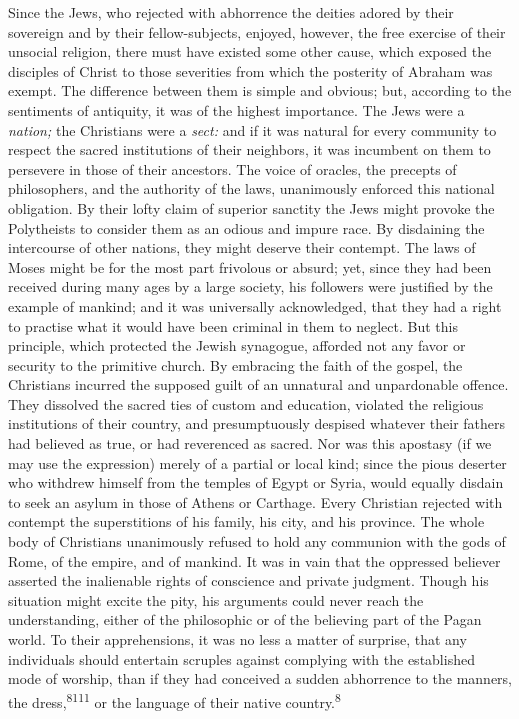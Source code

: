 Since the Jews, who rejected with abhorrence the deities adored
by their sovereign and by their fellow-subjects, enjoyed,
however, the free exercise of their unsocial religion, there must
have existed some other cause, which exposed the disciples of
Christ to those severities from which the posterity of Abraham
was exempt. The difference between them is simple and obvious;
but, according to the sentiments of antiquity, it was of the
highest importance. The Jews were a \textit{nation;} the Christians were
a \textit{sect:} and if it was natural for every community to respect
the sacred institutions of their neighbors, it was incumbent on
them to persevere in those of their ancestors. The voice of
oracles, the precepts of philosophers, and the authority of the
laws, unanimously enforced this national obligation. By their
lofty claim of superior sanctity the Jews might provoke the
Polytheists to consider them as an odious and impure race. By
disdaining the intercourse of other nations, they might deserve
their contempt. The laws of Moses might be for the most part
frivolous or absurd; yet, since they had been received during
many ages by a large society, his followers were justified by the
example of mankind; and it was universally acknowledged, that
they had a right to practise what it would have been criminal in
them to neglect. But this principle, which protected the Jewish
synagogue, afforded not any favor or security to the primitive
church. By embracing the faith of the gospel, the Christians
incurred the supposed guilt of an unnatural and unpardonable
offence. They dissolved the sacred ties of custom and education,
violated the religious institutions of their country, and
presumptuously despised whatever their fathers had believed as
true, or had reverenced as sacred. Nor was this apostasy (if we
may use the expression) merely of a partial or local kind; since
the pious deserter who withdrew himself from the temples of Egypt
or Syria, would equally disdain to seek an asylum in those of
Athens or Carthage. Every Christian rejected with contempt the
superstitions of his family, his city, and his province. The
whole body of Christians unanimously refused to hold any
communion with the gods of Rome, of the empire, and of mankind.
It was in vain that the oppressed believer asserted the
inalienable rights of conscience and private judgment. Though his
situation might excite the pity, his arguments could never reach
the understanding, either of the philosophic or of the believing
part of the Pagan world. To their apprehensions, it was no less a
matter of surprise, that any individuals should entertain
scruples against complying with the established mode of worship,
than if they had conceived a sudden abhorrence to the manners,
the dress,\textsuperscript{8111} or the language of their native country.\textsuperscript{8}

